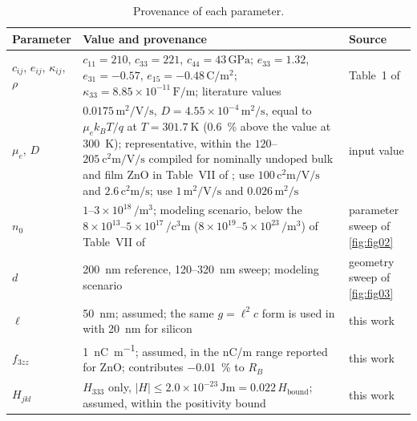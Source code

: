 \begin{table}[t]
\centering
\caption{Provenance of each parameter.}
\label{tab:provenance}
\small
\begin{tabular}{@{}p{}p{}p{}@{}}
\toprule
Parameter & Value and provenance & Source \\
\midrule
$c_{ij}$, $e_{ij}$, $\kappa_{ij}$, $\rho$ &
$c_{11}=210$, $c_{33}=221$, $c_{44}=43\,\si{\giga\pascal}$;
$e_{33}=1.32$, $e_{31}=-0.57$, $e_{15}=-0.48\,\si{\coulomb\per\square\metre}$;
$\kappa_{33}=8.85\times10^{-11}\,\si{\farad\per\metre}$; literature values &
Table~1 of \cite{zhang2025pscplate} \\
$\mu_e$, $D$ & $0.0175\,\si{\square\metre\per\volt\per\second}$,
$D=4.55\times10^{-4}\,\si{\square\metre\per\second}$, equal to $\mu_e k_BT/q$ at
$T=\SI{301.7}{\kelvin}$ (\SI{0.6}{\percent} above the value at
\SI{300}{\kelvin}); representative, within the $120$--$\SI{205}{\square\centi\metre\per\volt\per\second}$ compiled for nominally undoped bulk and film ZnO in Table~VII of \cite{ozgur2005zno}; \cite{zhang2025pscplate} use $100\,\si{\square\centi\metre\per\volt\per\second}$ and $2.6\,\si{\square\centi\metre\per\second}$; \cite{li2023sh} use $1\,\si{\square\metre\per\volt\per\second}$ and $0.026\,\si{\square\metre\per\second}$ &
input value \\
$n_0$ & $1\text{--}3\times10^{18}\,\si{\per\cubic\metre}$; modeling scenario, below the $8\times10^{13}$--$5\times10^{17}\,\si{\per\cubic\centi\metre}$ ($8\times10^{19}$--$5\times10^{23}\,\si{\per\cubic\metre}$) of Table~VII of \cite{ozgur2005zno} &
parameter sweep of \cref{fig:fig02} \\
$d$ & \SI{200}{\nano\metre} reference, 120--\SI{320}{\nano\metre} sweep;
modeling scenario & geometry sweep of \cref{fig:fig03} \\
$\ell$ & \SI{50}{\nano\metre}; assumed; the same $g=\ell^2c$ form is used in \cite{qu2023drag} with \SI{20}{\nano\metre} for silicon & this work \\
$f_{3zz}$ & \SI{1}{\nano\coulomb\per\metre}; assumed, in the nC/m range reported for ZnO; contributes
\SI{-0.01}{\percent} to $R_B$ & this work \\
$H_{jkl}$ & $H_{333}$ only, $|H|\le2.0\times10^{-23}\,\si{\joule\metre}
=0.022\,H_{\text{bound}}$; assumed, within the positivity bound & this work \\
\bottomrule
\end{tabular}
\end{table}

